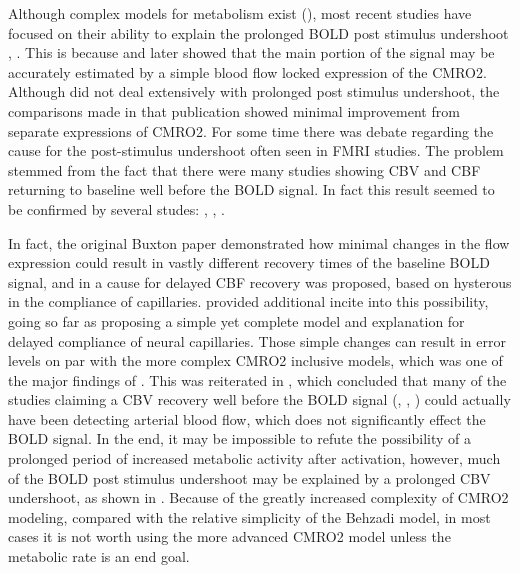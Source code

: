 \documentclass{article}
\begin{document}
Although complex
models for metabolism exist (\cite{Zheng2002}), most recent studies have
focused on their ability to explain the prolonged BOLD post stimulus 
undershoot \cite{Donahue2009}, \cite{Yacoub2006}. This is because \cite{Buxton2004}
and later \cite{Riera2004} showed that the main portion of the signal may be 
accurately estimated by a simple blood flow locked expression of the CMRO2. 
Although \cite{Deneux2006} did not deal extensively with prolonged post
stimulus undershoot, the comparisons made in that publication showed minimal
improvement from separate expressions of CMRO2. For some time there was 
debate regarding the cause for the post-stimulus undershoot often seen in 
FMRI studies. The problem stemmed from the fact that there were many studies
showing CBV and CBF returning to baseline well before the BOLD signal. In fact
this result seemed to be confirmed by several studes: \cite{Frahm2008}, \cite{Donahue2008}, 
\cite{Lu2004}. 


In fact, the original Buxton
paper demonstrated how minimal changes in the flow expression could
result in vastly different recovery times of the baseline BOLD signal, and
in \cite{Mandeville1999} a cause for delayed CBF recovery was proposed, based
on hysterous in the compliance of capillaries. \cite{Behzadi2005} provided
additional incite into this possibility, going so far as proposing a simple
yet complete model and explanation for delayed compliance of neural capillaries.
Those simple changes can result in error levels on par with the more 
complex CMRO2 inclusive models, which was one of the major findings of \cite{Deneux2006}. 
This was reiterated in \cite{Chan2009}, which concluded that many of
the studies claiming a CBV recovery well before the BOLD signal 
(\cite{Frahm1996}, \cite{Kruger1996}, \cite{Lu2004}) 
could actually have been detecting arterial blood flow, which does not significantly effect the
BOLD signal. 
In the end, it may be impossible to refute the
possibility of a prolonged period of increased metabolic activity after activation,
however, much of the BOLD post stimulus undershoot may be explained by a 
prolonged CBV undershoot, as shown in \cite{Chan2009}. Because of the greatly
increased complexity of CMRO2 modeling, compared with the relative simplicity
of the Behzadi model, in most cases it is not worth using the more advanced CMRO2
model unless the metabolic rate is an end goal. 
\end{document}
